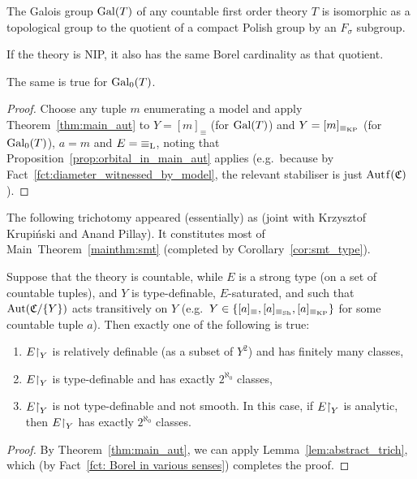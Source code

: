 	\begin{cor}
		\label{cor:galois_quotient}
		The Galois group $\operatorname{{Gal}}(T)$ of any countable first order theory $T$ is isomorphic as a topological group to the quotient of a compact Polish group by an $F_\sigma$ subgroup.
		
		If the theory is NIP, it also has the same Borel cardinality as that quotient.
				
		The same is true for $\operatorname{{Gal}}_0(T)$.
	\end{cor}
	\begin{proof}
		Choose any tuple $m$ enumerating a model and apply Theorem~\ref{thm:main_aut} to $Y=[m]_{\equiv}$ (for $\operatorname{{Gal}}(T)$) and $Y=[m]_{\equiv_{\mathrm{KP}}}$ (for $\operatorname{{Gal}}_0(T)$), $a=m$ and $E={\equiv_{\mathrm{L}}}$, noting that Proposition~\ref{prop:orbital_in_main_aut} applies (e.g.\ because by Fact~\ref{fct:diameter_witnessed_by_model}, the relevant stabiliser is just $\Autf(\fC)$).
	\end{proof}
	
	The following trichotomy appeared (essentially) as \cite[Corollary 6.1]{KPR15} (joint with Krzysztof Krupiński and Anand Pillay). It constitutes most of Main~Theorem~\ref{mainthm:smt} (completed by Corollary~\ref{cor:smt_type}).
	\begin{cor}
		\label{cor:trich_plus}
		Suppose that the theory is countable, while $E$ is a strong type (on a set of countable tuples), and $Y$ is type-definable, $E$-saturated, and such that $\operatorname{{Aut}}({\mathfrak C}/\{Y\})$ acts transitively on $Y$ (e.g.\ $Y\in \{[a]_\equiv,[a]_{\equiv_{\textrm{Sh}}},[a]_{\equiv_{\mathrm{KP}}} \}$ for some countable tuple $a$). Then exactly one of the following is true:
		\begin{enumerate}
			\item
			$E\mathord{\upharpoonright}_Y$ is relatively definable (as a subset of $Y^2$) and has finitely many classes,
			\item
			$E\mathord{\upharpoonright}_Y$ is type-definable and has exactly $2^{\aleph_0}$ classes,
			\item
			$E\mathord{\upharpoonright}_Y$ is not type-definable and not smooth. In this case, if $E\mathord{\upharpoonright}_Y$ is analytic, then $E\mathord{\upharpoonright}_Y$ has exactly $2^{\aleph_0}$ classes.
		\end{enumerate}
	\end{cor}
	\begin{proof}
		By Theorem~\ref{thm:main_aut}, we can apply Lemma~\ref{lem:abstract_trich}, which (by Fact~\ref{fct: Borel in various senses}) completes the proof.
	\end{proof}
	
